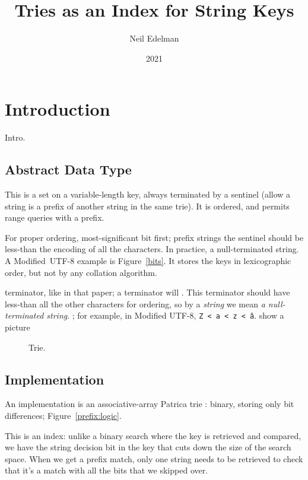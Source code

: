 \documentclass[12pt]{article}
\author{Neil Edelman}
\title{Tries as an Index for String Keys}
\date{2021}
\newcommand{\code}[1]{\colorbox{light-gray}{\texttt{#1}}}
\begin{document}
\maketitle


\section{Introduction}

\noindent
Intro.\cite{morrison1968patricia}\cite{fredkin1960trie}\cite{knuth1997sorting}

\subsection{Abstract Data Type}

This is a set on a variable-length key, always terminated by a sentinel (allow a string is a prefix of another string in the same trie). It is ordered, and permits range queries with a prefix.

For proper ordering, most-significant bit first; prefix strings the sentinel should be less-than the encoding of all the characters. In practice, a null-terminated string. A Modified~UTF-8 example is Figure~\ref{bits}. It stores the keys in lexicographic order, but not by any collation algorithm.

terminator, like in that paper; a terminator will . This terminator should have less-than all the other characters for ordering, so by a \emph{string} we mean \emph{a null-terminated string}. ; for example, in Modified UTF-8, \code{Z < a < z < â}. show a picture

\begin{figure} %
	\centering
	\caption{Trie.\label{trie}}
\end{figure}

\subsection{Implementation}

An implementation is an associative-array Patrica trie \cite{}: binary, storing only bit differences; Figure~\ref{prefix:logic}.

This is an index: unlike a binary search where the key is retrieved and compared, we have the string decision bit in the key that cuts down the size of the search space. When we get a prefix match, only one string needs to be retrieved to check that it's a match with all the bits that we skipped over.
\end{document}
